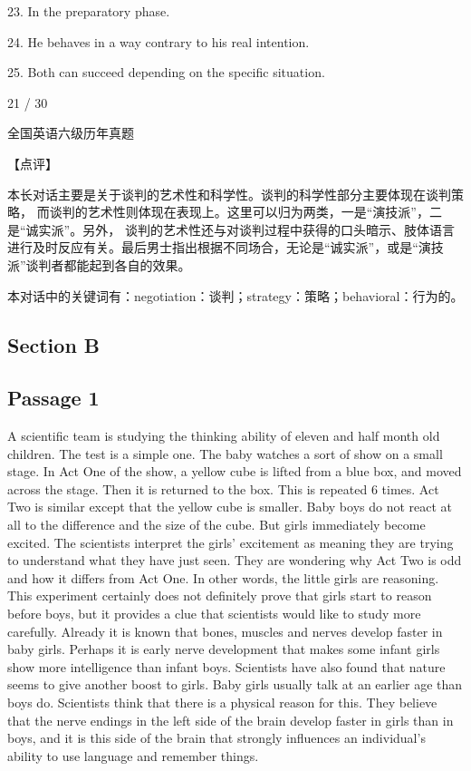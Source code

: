 \documentclass[UTF8,11pt]{ctexart}
\begin{document}
23. In the preparatory phase.


24. He behaves in a way contrary to his real intention.


25. Both can succeed depending on the specific situation.


21 / 30


全国英语六级历年真题


【点评】


本长对话主要是关于谈判的艺术性和科学性。谈判的科学性部分主要体现在谈判策略， 而谈判的艺术性则体现在表现上。这里可以归为两类，一是“演技派”，二是“诚实派”。另外， 谈判的艺术性还与对谈判过程中获得的口头暗示、肢体语言进行及时反应有关。最后男士指出根据不同场合，无论是“诚实派”，或是“演技派”谈判者都能起到各自的效果。


本对话中的关键词有：negotiation：谈判；strategy：策略；behavioral：行为的。


\subsection*{Section B}


\subsection*{Passage 1}


A scientific team is studying the thinking ability of eleven and half month old children. The test is a simple one. The baby watches a sort of show on a small stage. In Act One of the show, a yellow cube is lifted from a blue box, and moved across the stage. Then it is returned to the box. This is repeated 6 times. Act Two is similar except that the yellow cube is smaller. Baby boys do not react at all to the difference and the size of the cube. But girls immediately become excited. The scientists interpret the girls’ excitement as meaning they are trying to understand what they have just seen. They are wondering why Act Two is odd and how it differs from Act One. In other words, the little girls are reasoning. This experiment certainly does not definitely prove that girls start to reason before boys, but it provides a clue that scientists would like to study more carefully. Already it is known that bones, muscles and nerves develop faster in baby girls. Perhaps it is early nerve development that makes some infant girls show more intelligence than infant boys. Scientists have also found that nature seems to give another boost to girls. Baby girls usually talk at an earlier age than boys do. Scientists think that there is a physical reason for this. They believe that the nerve endings in the left side of the brain develop faster in girls than in boys, and it is this side of the brain that strongly influences an individual’s ability to use language and remember things.
\end{document}
